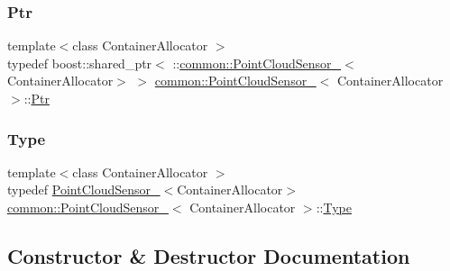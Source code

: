 \mbox{\label{structcommon_1_1PointCloudSensor___a7cbc6d865b866238a2f0005b949dc35c}} 
\subsubsection{\texorpdfstring{Ptr}{Ptr}}
{\footnotesize\ttfamily template$<$class Container\+Allocator $>$ \\
typedef boost\+::shared\+\_\+ptr$<$ \+::\hyperlink{structcommon_1_1PointCloudSensor__}{common\+::\+Point\+Cloud\+Sensor\+\_\+}$<$Container\+Allocator$>$ $>$ \hyperlink{structcommon_1_1PointCloudSensor__}{common\+::\+Point\+Cloud\+Sensor\+\_\+}$<$ Container\+Allocator $>$\+::\hyperlink{structcommon_1_1PointCloudSensor___a7cbc6d865b866238a2f0005b949dc35c}{Ptr}}

\mbox{\label{structcommon_1_1PointCloudSensor___a2d51d94fad4cb80d107e478a2c209623}} 
\subsubsection{\texorpdfstring{Type}{Type}}
{\footnotesize\ttfamily template$<$class Container\+Allocator $>$ \\
typedef \hyperlink{structcommon_1_1PointCloudSensor__}{Point\+Cloud\+Sensor\+\_\+}$<$Container\+Allocator$>$ \hyperlink{structcommon_1_1PointCloudSensor__}{common\+::\+Point\+Cloud\+Sensor\+\_\+}$<$ Container\+Allocator $>$\+::\hyperlink{structcommon_1_1PointCloudSensor___a2d51d94fad4cb80d107e478a2c209623}{Type}}



\subsection{Constructor \& Destructor Documentation}
\mbox{\label{structcommon_1_1PointCloudSensor___af154d28b9da46c67ba6de075d22a5f34}} 
